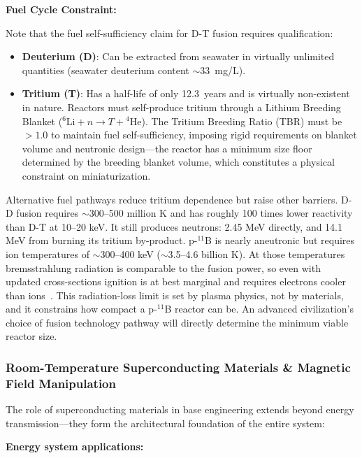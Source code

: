 \documentclass[aps,prd,twocolumn,superscriptaddress,nofootinbib]{revtex4-2}
\begin{document}
\textbf{Fuel Cycle Constraint:}

Note that the fuel self-sufficiency claim for D-T fusion requires qualification:

\begin{itemize}
  \item \textbf{Deuterium (D)}: Can be extracted from seawater in virtually unlimited quantities (seawater deuterium content ${\sim}$\SI{33}{mg/L}).
  \item \textbf{Tritium (T)}: Has a half-life of only \SI{12.3}{years} and is virtually non-existent in nature. Reactors must self-produce tritium through a Lithium Breeding Blanket (${}^{6}\text{Li} + n \to T + {}^{4}\text{He}$). The Tritium Breeding Ratio (TBR) must be $>1.0$ to maintain fuel self-sufficiency, imposing rigid requirements on blanket volume and neutronic design---the reactor has a minimum size floor determined by the breeding blanket volume, which constitutes a physical constraint on miniaturization.
\end{itemize}

Alternative fuel pathways reduce tritium dependence but raise other barriers. D-D fusion requires ${\sim}$300--500 million K and has roughly 100 times lower reactivity than D-T at 10--20 keV. It still produces neutrons: 2.45 MeV directly, and 14.1 MeV from burning its tritium by-product. p-${}^{11}$B is nearly aneutronic but requires ion temperatures of ${\sim}$300--400 keV (${\sim}$3.5--4.6 billion K). At those temperatures bremsstrahlung radiation is comparable to the fusion power, so even with updated cross-sections ignition is at best marginal and requires electrons cooler than ions~\cite{Putvinski2019}. This radiation-loss limit is set by plasma physics, not by materials, and it constrains how compact a p-${}^{11}$B reactor can be. An advanced civilization's choice of fusion technology pathway will directly determine the minimum viable reactor size.

\subsubsection{Room-Temperature Superconducting Materials \& Magnetic Field Manipulation}\label{sec:room-temp-sc}

The role of superconducting materials in base engineering extends beyond energy transmission---they form the architectural foundation of the entire system:

\textbf{Energy system applications:}
\end{document}
